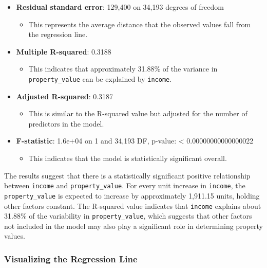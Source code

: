 \documentclass[
]{book}
\providecommand{\tightlist}{%
  \setlength{\itemsep}{0pt}\setlength{\parskip}{0pt}}
\begin{document}
\begin{itemize}
\item
  \textbf{Residual standard error}: 129,400 on 34,193 degrees of freedom

  \begin{itemize}
  \tightlist
  \item
    This represents the average distance that the observed values fall from the regression line.
  \end{itemize}
\item
  \textbf{Multiple R-squared}: 0.3188

  \begin{itemize}
  \tightlist
  \item
    This indicates that approximately 31.88\% of the variance in \texttt{property\_value} can be explained by \texttt{income}.
  \end{itemize}
\item
  \textbf{Adjusted R-squared}: 0.3187

  \begin{itemize}
  \tightlist
  \item
    This is similar to the R-squared value but adjusted for the number of predictors in the model.
  \end{itemize}
\item
  \textbf{F-statistic}: 1.6e+04 on 1 and 34,193 DF, p-value: \textless{} 0.00000000000000022

  \begin{itemize}
  \tightlist
  \item
    This indicates that the model is statistically significant overall.
  \end{itemize}
\end{itemize}

The results suggest that there is a statistically significant positive relationship between \texttt{income} and \texttt{property\_value}. For every unit increase in \texttt{income}, the \texttt{property\_value} is expected to increase by approximately 1,911.15 units, holding other factors constant. The R-squared value indicates that \texttt{income} explains about 31.88\% of the variability in \texttt{property\_value}, which suggests that other factors not included in the model may also play a significant role in determining property values.

\hypertarget{visualizing-the-regression-line}{%
\subsubsection*{Visualizing the Regression Line}\label{visualizing-the-regression-line}}
\end{document}
